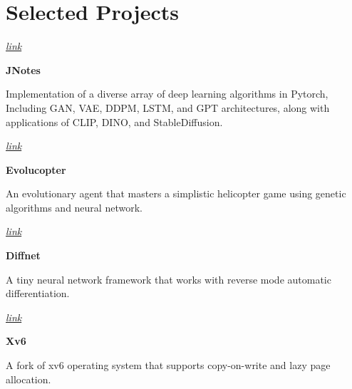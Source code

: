 	\section{Selected Projects}




\begin{twocolentry}{
		
		
		\textit{\href{https://github.com/mehrdad3301/jnotes}{link}}}
	\textbf{JNotes}
\end{twocolentry}

\begin{onecolentry}
	Implementation of a diverse array of deep learning algorithms in Pytorch, Including GAN, VAE, DDPM, LSTM, and GPT architectures, along with applications of CLIP, DINO, and StableDiffusion. 
\end{onecolentry}


\vspace{0.2 cm}

\begin{twocolentry}{
		
		
		\textit{\href{https://github.com/mehrdad3301/EvoluCop}{link}}}
	\textbf{Evolucopter}
\end{twocolentry}

\begin{onecolentry}
	An evolutionary agent that masters a simplistic helicopter game using genetic algorithms and neural network.  
\end{onecolentry}


\vspace{0.2 cm}

\begin{twocolentry}{
		
		\textit{\href{https://github.com/mehrdad3301/DiffNet}{link}}}
	\textbf{Diffnet}
\end{twocolentry}

\begin{onecolentry}
	A tiny neural network framework that works with reverse mode automatic differentiation. 
\end{onecolentry}

\vspace{0.2 cm}

\begin{twocolentry}{
		
		
		\textit{\href{https://github.com/mehrdad3301/xv6-riscv}{link}}}
	\textbf{Xv6}
\end{twocolentry}

\begin{onecolentry}
	A fork of xv6 operating system that supports copy-on-write and lazy page allocation.
\end{onecolentry}
\vspace{0.2 cm}

